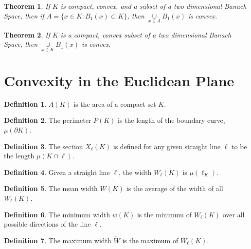 \documentclass[oneside]{book}
\newtheorem{theorem}{Theorem}[section]
\theoremstyle{definition}
\newtheorem{definition}{Definition}[section]
\begin{document}
\begin{theorem}
If $K$ is compact, convex, and a subset of a two dimensional Banach Space, then if $A = \{x\in K:B_{1}(x)\subset K\}$, then $\underset{x\in A}\cup B_{1}(x)$ is convex.
\end{theorem}

\begin{theorem}
If $K$ is a compact, convex subset of a two dimensional Banach Space, then $\underset{x\in K}\cup B_{1}(x)$ is convex.
\end{theorem}









\section{Convexity in the Euclidean Plane}

\begin{definition}
$A(K)$ is the area of a compact set $K$.
\end{definition}

\begin{definition}
The perimeter $P(K)$ is the length of the boundary curve, $\mu(\partial K)$.
\end{definition}

\begin{definition}
The section $X_{\ell}(K)$ is defined for any given straight line $\ell$ to be the length $\mu(K\cap \ell)$.
\end{definition}

\begin{definition}
Given a straight line $\ell$, the width $W_{\ell}(K)$ is $\mu(\ell_{K})$.
\end{definition}

\begin{definition}
The mean width $W(K)$ is the average of the width of all $W_{\ell}(K)$.
\end{definition}

\begin{definition}
The minimum width $w(K)$ is the minimum of $W_{\ell}(K)$ over all possible directions of the line $\ell$.
\end{definition}

\begin{definition}
The maximum width $\check{W}$ is the maximum of $W_{\ell}(K)$.
\end{definition}
\end{document}
